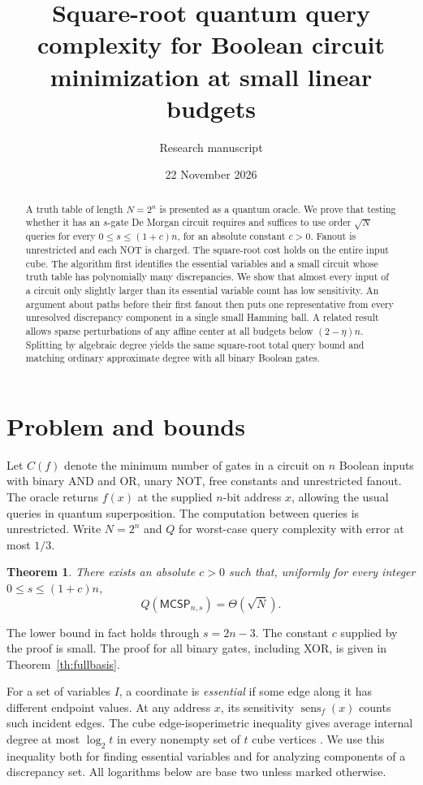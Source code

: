 \documentclass[11pt]{article}
\title{Square-root quantum query complexity for Boolean circuit minimization at small linear budgets}
\author{Research manuscript}
\date{22 November 2026}
\newtheorem{theorem}{Theorem}[section]
\newcommand{\MC}{\mathsf{MCSP}}
\newcommand{\sen}{\operatorname{sens}}
\begin{document}
\maketitle
\begin{abstract}
A truth table of length $N=2^n$ is presented as a quantum oracle. We prove that testing whether it has an $s$-gate De Morgan circuit requires and suffices to use order $\sqrt N$ queries for every $0\le s\le(1+c)n$, for an absolute constant $c>0$. Fanout is unrestricted and each NOT is charged. The square-root cost holds on the entire input cube. The algorithm first identifies the essential variables and a small circuit whose truth table has polynomially many discrepancies. We show that almost every input of a circuit only slightly larger than its essential variable count has low sensitivity. An argument about paths before their first fanout then puts one representative from every unresolved discrepancy component in a single small Hamming ball. A related result allows sparse perturbations of any affine center at all budgets below $(2-\eta)n$. Splitting by algebraic degree yields the same square-root total query bound and matching ordinary approximate degree with all binary Boolean gates.
\end{abstract}

\section{Problem and bounds}
Let $C(f)$ denote the minimum number of gates in a circuit on $n$ Boolean inputs with binary AND and OR, unary NOT, free constants and unrestricted fanout. The oracle returns $f(x)$ at the supplied $n$-bit address $x$, allowing the usual queries in quantum superposition. The computation between queries is unrestricted. Write $N=2^n$ and $Q$ for worst-case query complexity with error at most $1/3$.
\begin{theorem}\label{th:main}
There exists an absolute $c>0$ such that, uniformly for every integer $0\le s\le(1+c)n$,
\[
                   Q(\MC_{n,s})=\Theta(\sqrt N).
\]
\end{theorem}
The lower bound in fact holds through $s=2n-3$. The constant $c$ supplied by the proof is small. The proof for all binary gates, including XOR, is given in Theorem~\ref{th:fullbasis}.

For a set of variables $I$, a coordinate is \emph{essential} if some edge along it has different endpoint values. At any address $x$, its sensitivity $\sen_f(x)$ counts such incident edges. The cube edge-isoperimetric inequality gives average internal degree at most $\log_2 t$ in every nonempty set of $t$ cube vertices \cite{harper}. We use this inequality both for finding essential variables and for analyzing components of a discrepancy set. All logarithms below are base two unless marked otherwise.
\end{document}
